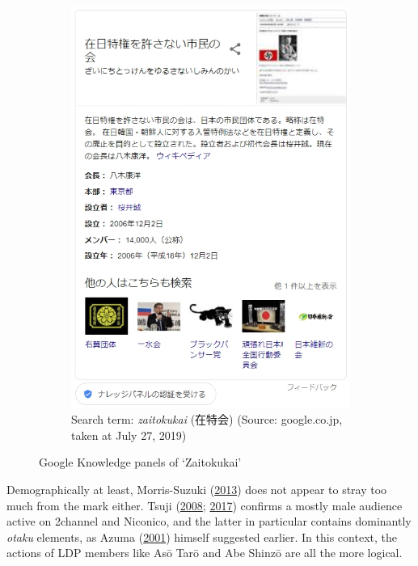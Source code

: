 \documentclass[10pt,british,A4paper,oneside]{memoir}
\begin{document}
\begin{figure}[!htb]
\begin{subfigure}[b]{0.40\textwidth}
 \includegraphics[width=\textwidth]{images/2channel/zaitokukaijp.jpg}
 \caption{Search term: \textit{zaitokukai} (在特会) (Source: google.co.jp, taken at July 27, 2019)}
 \label{fig:zaitokukaijp}
 \end{subfigure}
 \caption{Google Knowledge panels of `Zaitokukai'}\label{fig:googlezaitokukai}
\end{figure}

Demographically at least, Morris-Suzuki
(\protect\hyperlink{ref-morris-suzuki_freedom_2013}{2013}) does not
appear to stray too much from the mark either. Tsuji
(\protect\hyperlink{ref-tsuji_eng:_2008}{2008};
\protect\hyperlink{ref-tsuji_eng._2017}{2017}) confirms a mostly male
audience active on 2channel and Niconico, and the latter in particular
contains dominantly \emph{otaku} elements, as Azuma
(\protect\hyperlink{ref-azuma_otaku:_2001}{2001}) himself suggested
earlier. In this context, the actions of LDP members like Asō Tarō and Abe Shinzō are all the more logical.
\end{document}
